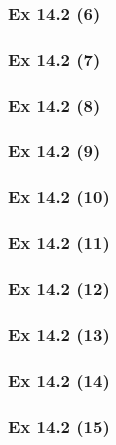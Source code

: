 \subsubsection{Ex 14.2 (6)}\label{sec:Ex_14.2.6}

\subsubsection{Ex 14.2 (7)}\label{sec:Ex_14.2.7}

\subsubsection{Ex 14.2 (8)}\label{sec:Ex_14.2.8}

\subsubsection{Ex 14.2 (9)}\label{sec:Ex_14.2.9}

\subsubsection{Ex 14.2 (10)}\label{sec:Ex_14.2.10}

\newpage		%

\subsubsection{Ex 14.2 (11)}\label{sec:Ex_14.2.11}

\subsubsection{Ex 14.2 (12)}\label{sec:Ex_14.2.12}

\subsubsection{Ex 14.2 (13)}\label{sec:Ex_14.2.13}

\subsubsection{Ex 14.2 (14)}\label{sec:Ex_14.2.14}

\subsubsection{Ex 14.2 (15)}\label{sec:Ex_14.2.15}

